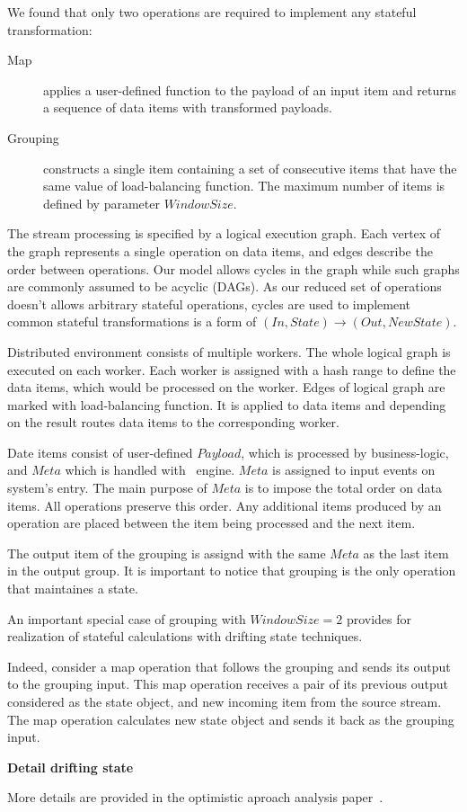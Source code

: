\label {fs-short-model}

We found that only two operations are required to implement any stateful transformation:

\begin {description}
  \item [Map] applies a user-defined function to the payload of an input item and returns a sequence of data items with transformed payloads. 
  \item [Grouping] constructs a single item containing a set of consecutive items that have the same value of load-balancing function. The maximum number of items is defined by parameter $Window Size$. 
\end {description}

The stream processing is specified by a logical execution graph. Each vertex of the graph represents a single operation on data items, and edges describe the order between operations. Our model allows cycles in the graph while such graphs are commonly assumed to be acyclic (DAGs). As our reduced set of operations doesn't allows arbitrary stateful operations, cycles are used to implement common stateful transformations is a form of $(In, State) \rightarrow (Out, NewState)$.

Distributed environment consists of multiple workers. The whole logical graph is executed on each worker. Each worker is assigned with a hash range to define the data items, which would be processed on the worker. Edges of logical graph are marked with load-balancing function. It is applied to data items and depending on the result routes data items to the corresponding worker.

Date items consist of user-defined $Payload$, which is processed by business-logic, and $Meta$ which is handled with \FlameStream\ engine. $Meta$ is assigned to input events on system's entry. The main purpose of $Meta$ is to impose the total order on data items. All operations preserve this order. Any additional items produced by an operation are placed between the item being processed and the next item.


The output item of the grouping is assignd with the same $Meta$ as the last item in the output group. It is important to notice that grouping is the only operation that maintaines a state.

An important special case of grouping with $Window Size = 2$  provides for realization of stateful calculations with drifting state techniques.  

Indeed, consider a map operation that follows the grouping and sends its output to the grouping input. This map operation receives a pair of its previous output considered as the state object, and new incoming item from the source stream. The map operation calculates new state object and sends it back as the grouping input. 

{\bf Detail drifting state}

More details are provided in the optimistic aproach analysis paper~\cite{we2018seim}.
